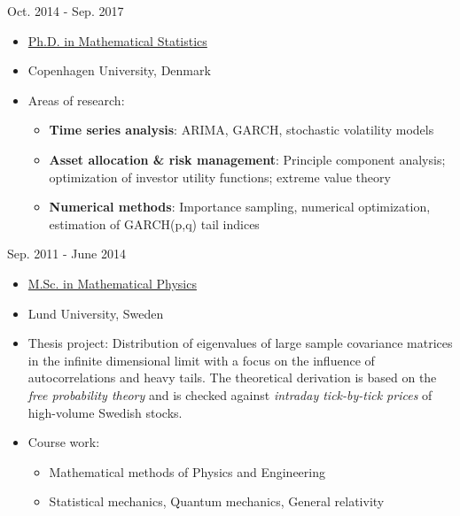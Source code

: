 \documentclass[a4paper]{twentysecondcv} %
\begin{document}
\begin{minipage}{0.15\linewidth}
  Oct. 2014 - Sep. 2017
\end{minipage} \hfill
\begin{minipage}{0.85\linewidth}
  \begin{itemize}
  \item \underline{Ph.D. in Mathematical Statistics}
  \item Copenhagen University, Denmark
  \item Areas of research:
    \begin{itemize}
      \item {\bf Time series analysis}: ARIMA, GARCH, stochastic volatility
        models
      \item {\bf Asset allocation \& risk management}: Principle component
        analysis; optimization of investor utility functions; extreme
        value theory
      \item {\bf Numerical methods}: Importance sampling, numerical
        optimization, estimation of GARCH(p,q) tail indices
    \end{itemize}
  \end{itemize}
\end{minipage}

\vspace{3mm}

\begin{minipage}{0.15\linewidth}
  Sep. 2011 - June 2014
\end{minipage} \hfill
\begin{minipage}{0.85\linewidth}
  \begin{itemize}
  \item \underline{M.Sc. in Mathematical Physics}
  \item Lund University, Sweden
  \item Thesis project: Distribution of eigenvalues of large
    sample covariance matrices in the infinite dimensional limit with
    a focus on the influence of autocorrelations and heavy tails. The
    theoretical derivation is based on the {\it free probability
      theory} and is checked against {\it intraday tick-by-tick
      prices} of high-volume Swedish stocks.
  \item Course work:    
    \begin{itemize}
      \item Mathematical methods of Physics and Engineering
      \item Statistical mechanics, Quantum mechanics, General
        relativity
    \end{itemize}
  \end{itemize}
\end{minipage}
\vspace{3mm}
\end{document}
